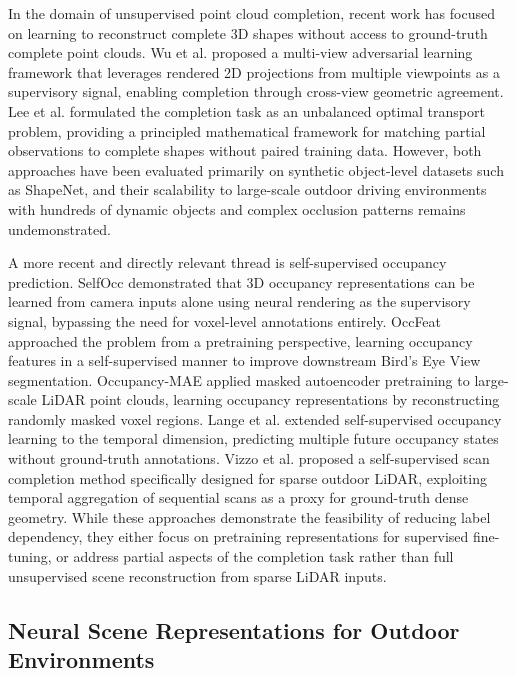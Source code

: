 \documentclass[a4paper, 12pt]{article}
\begin{document}
	In the domain of unsupervised point cloud completion, recent work has focused
	on learning to reconstruct complete 3D shapes without access to ground-truth
	complete point clouds. Wu et al. \cite{10959142} proposed a multi-view
	adversarial learning framework that leverages rendered 2D projections from
	multiple viewpoints as a supervisory signal, enabling completion through
	cross-view geometric agreement. Lee et al.
	\cite{lee2025unsupervisedpointcloudcompletion} formulated the completion task
	as an unbalanced optimal transport problem, providing a principled mathematical
	framework for matching partial observations to complete shapes without
	paired training data. However, both approaches have been evaluated primarily on
	synthetic object-level datasets such as ShapeNet, and their scalability to
	large-scale outdoor driving environments with hundreds of dynamic objects and
	complex occlusion patterns remains undemonstrated.
	
	A more recent and directly relevant thread is self-supervised occupancy
	prediction. SelfOcc \cite{Huang_2024_CVPR} demonstrated that 3D occupancy
	representations can be learned from camera inputs alone using neural rendering
	as the supervisory signal, bypassing the need for voxel-level annotations
	entirely. OccFeat \cite{Sirko-Galouchenko_2024_CVPR} approached the problem
	from a pretraining perspective, learning occupancy features in a
	self-supervised manner to improve downstream Bird's Eye View segmentation.
	Occupancy-MAE \cite{10273603} applied masked autoencoder pretraining to
	large-scale LiDAR point clouds, learning occupancy representations by
	reconstructing randomly masked voxel regions. Lange et al.
	\cite{lange2025selfsupervisedmultifutureoccupancyforecasting} extended
	self-supervised occupancy learning to the temporal dimension, predicting
	multiple future occupancy states without ground-truth annotations. Vizzo et
	al. \cite{9812507}
	proposed a self-supervised scan completion method specifically designed for
	sparse outdoor LiDAR, exploiting temporal aggregation of sequential scans as a
	proxy for ground-truth dense geometry. While these approaches demonstrate the
	feasibility of reducing label dependency, they either focus on pretraining
	representations for supervised fine-tuning, or address partial aspects of the
	completion task rather than full unsupervised scene reconstruction from sparse
	LiDAR inputs.
	
	\subsection{Neural Scene Representations for Outdoor Environments}
	
\end{document}

